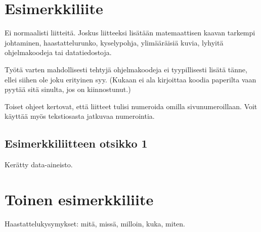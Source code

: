 \section{Esimerkkiliite}
\label{sec:app1}

Ei normaalisti liitteitä. Joskus liitteeksi lisätään matemaattisen kaavan
tarkempi johtaminen, haastattelurunko, kyselypohja, 
ylimääräisiä kuvia, lyhyitä ohjelmakoodeja tai datatiedostoja.

Työtä varten mahdollisesti tehtyjä ohjelmakoodeja ei tyypillisesti
lisätä tänne, ellei siihen ole joku erityinen syy. (Kukaan ei ala kirjoittaa koodia paperilta vaan pyytää sitä sinulta, jos on kiinnostunut.)

Toiset ohjeet kertovat, että liitteet tulisi numeroida omilla sivunumeroillaan. Voit käyttää myös tekstiosasta jatkuvaa numerointia.

\subsection{Esimerkkiliitteen otsikko 1}
\label{sec:app1_1}

Kerätty data-aineisto.

\section{Toinen esimerkkiliite}
\label{sec:app2}

Haastattelukysymykset: mitä, missä, milloin, kuka, miten.
